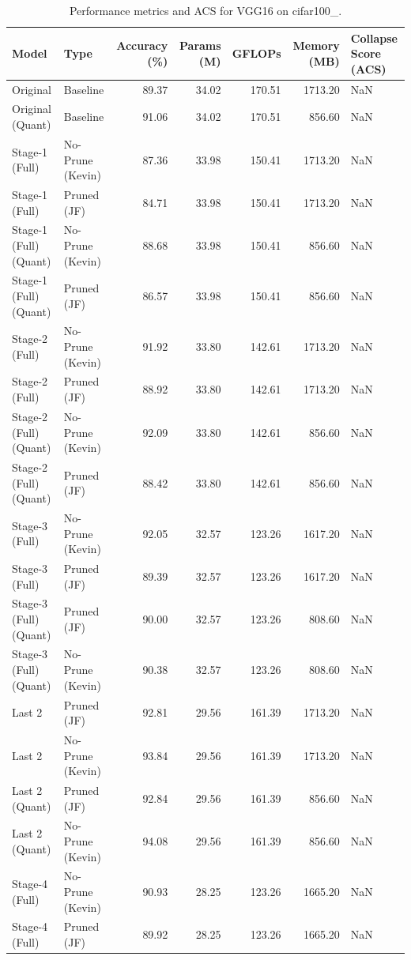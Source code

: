 \begin{table}
\caption{Performance metrics and ACS for VGG16 on cifar100_.}
\label{tab:VGG16_cifar100_}
\begin{tabular}{llrrrrl}
\toprule
Model & Type & Accuracy (\%) & Params (M) & GFLOPs & Memory (MB) & Collapse Score (ACS) \\
\midrule
Original & Baseline & 89.37 & 34.02 & 170.51 & 1713.20 & NaN \\
Original
(Quant) & Baseline & 91.06 & 34.02 & 170.51 & 856.60 & NaN \\
Stage-1 (Full) & No-Prune (Kevin) & 87.36 & 33.98 & 150.41 & 1713.20 & NaN \\
Stage-1 (Full) & Pruned (JF) & 84.71 & 33.98 & 150.41 & 1713.20 & NaN \\
Stage-1 (Full)
(Quant) & No-Prune (Kevin) & 88.68 & 33.98 & 150.41 & 856.60 & NaN \\
Stage-1 (Full)
(Quant) & Pruned (JF) & 86.57 & 33.98 & 150.41 & 856.60 & NaN \\
Stage-2 (Full) & No-Prune (Kevin) & 91.92 & 33.80 & 142.61 & 1713.20 & NaN \\
Stage-2 (Full) & Pruned (JF) & 88.92 & 33.80 & 142.61 & 1713.20 & NaN \\
Stage-2 (Full)
(Quant) & No-Prune (Kevin) & 92.09 & 33.80 & 142.61 & 856.60 & NaN \\
Stage-2 (Full)
(Quant) & Pruned (JF) & 88.42 & 33.80 & 142.61 & 856.60 & NaN \\
Stage-3 (Full) & No-Prune (Kevin) & 92.05 & 32.57 & 123.26 & 1617.20 & NaN \\
Stage-3 (Full) & Pruned (JF) & 89.39 & 32.57 & 123.26 & 1617.20 & NaN \\
Stage-3 (Full)
(Quant) & Pruned (JF) & 90.00 & 32.57 & 123.26 & 808.60 & NaN \\
Stage-3 (Full)
(Quant) & No-Prune (Kevin) & 90.38 & 32.57 & 123.26 & 808.60 & NaN \\
Last 2 & Pruned (JF) & 92.81 & 29.56 & 161.39 & 1713.20 & NaN \\
Last 2 & No-Prune (Kevin) & 93.84 & 29.56 & 161.39 & 1713.20 & NaN \\
Last 2
(Quant) & Pruned (JF) & 92.84 & 29.56 & 161.39 & 856.60 & NaN \\
Last 2
(Quant) & No-Prune (Kevin) & 94.08 & 29.56 & 161.39 & 856.60 & NaN \\
Stage-4 (Full) & No-Prune (Kevin) & 90.93 & 28.25 & 123.26 & 1665.20 & NaN \\
Stage-4 (Full) & Pruned (JF) & 89.92 & 28.25 & 123.26 & 1665.20 & NaN \\

\end{tabular}
\end{table}
